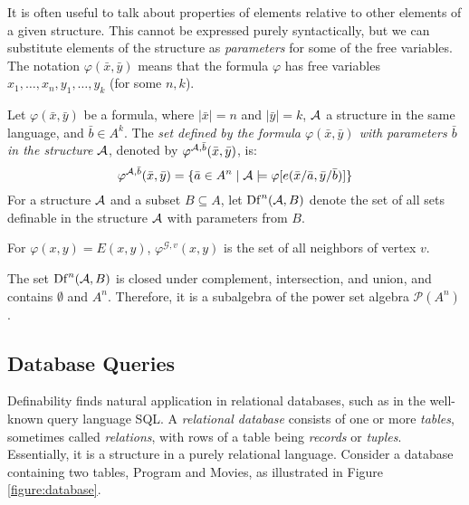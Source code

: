It is often useful to talk about properties of elements relative to other elements of a given structure. This cannot be expressed purely syntactically, but we can substitute elements of the structure as \emph{parameters} for some of the free variables. The notation $\varphi(\bar x,\bar y)$ means that the formula $\varphi$ has free variables $x_1,\dots,x_n,y_1,\dots,y_k$ (for some $n,k$).

\begin{definition}
    Let $\varphi(\bar x,\bar y)$ be a formula, where $|\bar x|=n$ and $|\bar y|=k$, $\mathcal{A}$ a structure in the same language, and $\bar b\in A^k$. The \emph{set defined by the formula $\varphi(\bar x,\bar y)$ with parameters $\bar b$ in the structure $\mathcal{A}$}, denoted by $\varphi^{\mathcal{A},\bar b}(\bar x,\bar y)$, is:
    $$
    \varphi^{\mathcal{A},\bar b}(\bar x,\bar y)=\{\bar a\in A^n\mid\mathcal{A}\models\varphi[e(\bar x/\bar a,\bar y/\bar b)]\}
    $$
    For a structure $\mathcal{A}$ and a subset $B\subseteq A$, let $\mathrm{Df}^n(\mathcal{A},B)$ denote the set of all sets definable in the structure $\mathcal{A}$ with parameters from $B$.
\end{definition}


\begin{example}
    For $\varphi(x,y)=E(x,y)$, $\varphi^{\mathcal G,v}(x,y)$ is the set of all neighbors of vertex $v$.
\end{example}

\begin{observation}
The set $\mathrm{Df}^n(\mathcal{A},B)$ is closed under complement, intersection, and union, and contains $\emptyset$ and $A^n$. Therefore, it is a subalgebra of the power set algebra $\mathcal P(A^n)$.
\end{observation}

\subsection{Database Queries}

Definability finds natural application in relational databases, such as in the well-known query language SQL. A \emph{relational database} consists of one or more \emph{tables}, sometimes called \emph{relations}, with rows of a table being \emph{records} or \emph{tuples}. Essentially, it is a structure in a purely relational language. Consider a database containing two tables, Program and Movies, as illustrated in Figure \ref{figure:database}.

